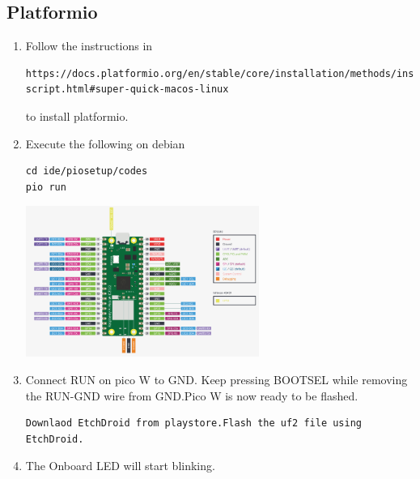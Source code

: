 \subsection{Platformio }
\begin{enumerate}[label=\arabic*.,ref=\theenumi]
\item Follow the instructions in 
\begin{lstlisting}
https://docs.platformio.org/en/stable/core/installation/methods/installer-script.html#super-quick-macos-linux
\end{lstlisting}
to install platformio.
\item Execute the following on debian
\begin{lstlisting}
cd ide/piosetup/codes
pio run
\end{lstlisting}
\begin{center}
    \includegraphics[width=0.6\textwidth, height=0.3\textheight]{installation/picowpinout.jpg}
    \vspace{0.5em} %
\end{center}
\vspace{0.5em} %
\item Connect RUN on pico W to GND. Keep pressing BOOTSEL while removing the RUN-GND wire from GND.Pico W is now ready to be flashed.
\begin{lstlisting}
Downlaod EtchDroid from playstore.Flash the uf2 file using EtchDroid.
\end{lstlisting}
\vspace{0.5em} %
\item The Onboard LED will start blinking.
\end{enumerate}





